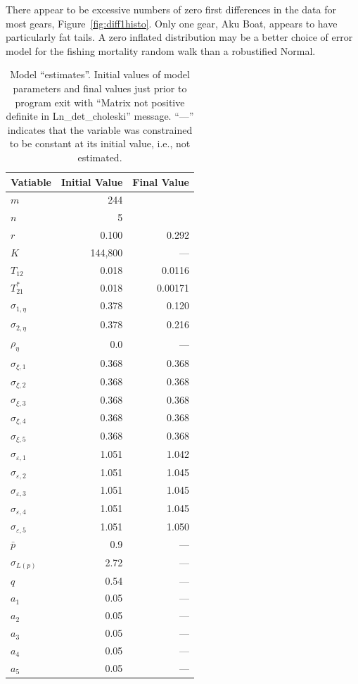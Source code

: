\documentclass[12pt,letterpaper]{article}
\begin{document}
There appear to be excessive numbers of zero first differences
in the data for most gears, Figure~\ref{fig:diff1histo}. Only one
gear, Aku Boat, appears to have particularly fat tails. A zero
inflated distribution may be a better choice of error model for the
fishing mortality random walk than a robustified Normal.

\begin{table}
\caption{\label{tab:testrun}
Model ``estimates''. Initial values of model parameters and
final values just prior to program exit with 
``Matrix not positive definite in Ln\_det\_choleski'' message.
``---'' indicates that the variable was constrained to be constant at
its initial value, i.e., not estimated.
}
\begin{center}
\begin{tabular}{lrr}
\hline
Vatiable & Initial Value & Final Value\\
\hline
$m$ &  244\\
$n$ &  5\\
\hline
$r$ & 0.100 &  0.292\\
$K$ & 144,800 & --- \\
$T_{12}$ & 0.018 & 0.0116\\
$T^*_{21}$& 0.018 & 0.00171\\
\hline
$\sigma_{1,\eta}$ & 0.378 & 0.120\\
$\sigma_{2,\eta}$ & 0.378 & 0.216\\
$\rho_\eta$ & 0.0 & --- \\
\hline
$\sigma_{\xi,1}$ & 0.368 & 0.368\\
$\sigma_{\xi,2}$ & 0.368 & 0.368\\
$\sigma_{\xi,3}$ & 0.368 & 0.368\\
$\sigma_{\xi,4}$ & 0.368 & 0.368\\
$\sigma_{\xi,5}$ & 0.368 & 0.368\\
\hline
$\sigma_{\varepsilon,1}$ & 1.051 & 1.042\\
$\sigma_{\varepsilon,2}$ & 1.051 & 1.045\\
$\sigma_{\varepsilon,3}$ & 1.051 & 1.045\\
$\sigma_{\varepsilon,4}$ & 1.051 & 1.045\\
$\sigma_{\varepsilon,5}$ & 1.051 & 1.050\\
\hline
$\bar{p}$ & 0.9 & ---\\
$\sigma_{L(p)}$ & 2.72 & ---\\
$q$ & 0.54 & ---\\
$a_1$ & 0.05 & ---\\
$a_2$ & 0.05 & ---\\
$a_3$ & 0.05 & ---\\
$a_4$ & 0.05 & ---\\
$a_5$ & 0.05 & ---\\
\hline
\end{tabular}
\end{center}
\end{table}
\end{document}
